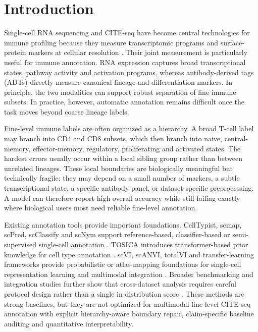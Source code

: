 \documentclass[unnumsec,webpdf,contemporary,large,numbered]{oup-authoring-template}
\begin{document}
\maketitle

\section{Introduction}

Single-cell RNA sequencing and CITE-seq have become central technologies for immune profiling because they measure transcriptomic programs and surface-protein markers at cellular resolution \citep{satija2015,butler2018,stuart2019,hao2021,stoeckius2017cite,luecken2019}. Their joint measurement is particularly useful for immune annotation. RNA expression captures broad transcriptional states, pathway activity and activation programs, whereas antibody-derived tags (ADTs) directly measure canonical lineage and differentiation markers. In principle, the two modalities can support robust separation of fine immune subsets. In practice, however, automatic annotation remains difficult once the task moves beyond coarse lineage labels.

Fine-level immune labels are often organized as a hierarchy. A broad T-cell label may branch into CD4 and CD8 subsets, which then branch into naive, central-memory, effector-memory, regulatory, proliferating and activated states. The hardest errors usually occur within a local sibling group rather than between unrelated lineages. These local boundaries are biologically meaningful but technically fragile: they may depend on a small number of markers, a subtle transcriptional state, a specific antibody panel, or dataset-specific preprocessing. A model can therefore report high overall accuracy while still failing exactly where biological users most need reliable fine-level annotation.

Existing annotation tools provide important foundations. CellTypist, scmap, scPred, scClassify and scNym support reference-based, classifier-based or semi-supervised single-cell annotation \citep{aran2019,kiselev2018scmap,alquicira2020scpred,lin2020scclassify,kimmel2021scnym,dominguezconde2022,abdelaal2019}. TOSICA introduces transformer-based prior knowledge for cell type annotation \citep{chen2023tosica}. scVI, scANVI, totalVI and transfer-learning frameworks provide probabilistic or atlas-mapping foundations for single-cell representation learning and multimodal integration \citep{lopez2018,xu2021scvi,gayoso2021totalvi,gayoso2022scvi,lotfollahi2022}. Broader benchmarking and integration studies further show that cross-dataset analysis requires careful protocol design rather than a single in-distribution score \citep{haghverdi2018,korsunsky2019,luecken2022,argelaguet2021}. These methods are strong baselines, but they are not optimized for multimodal fine-level CITE-seq annotation with explicit hierarchy-aware boundary repair, claim-specific baseline auditing and quantitative interpretability.
\end{document}
